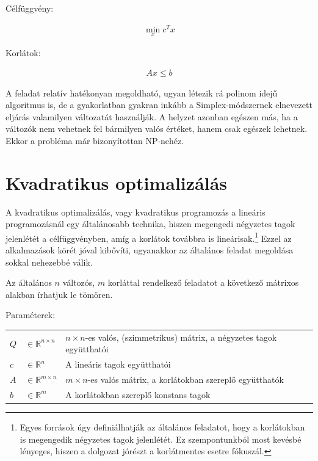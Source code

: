 Célfüggvény:

\begin{align}
	\min_{x} c^T x 
\end{align}

Korlátok:

\begin{align}
	Ax \leq b
\end{align}

A feladat relatív hatékonyan megoldható, ugyan létezik rá polinom idejű algoritmus is, de a gyakorlatban gyakran inkább a Simplex-módszernek elnevezett eljárás valamilyen változatát használják.
A helyzet azonban egészen más, ha a változók nem vehetnek fel bármilyen valós értéket, hanem csak egészek lehetnek. Ekkor a probléma már bizonyítottan NP-nehéz.


\section{Kvadratikus optimalizálás}\label{sec:QuadOpt}

A kvadratikus optimalizálás, vagy kvadratikus programozás a lineáris programozásnál egy általánosabb technika, hiszen megengedi négyzetes tagok jelenlétét a célfüggvényben, amíg a korlátok továbbra is lineárisak.\footnote{Egyes források úgy definiálhatják az általános feladatot, hogy a korlátokban is megengedik négyzetes tagok jelenlétét. Ez szempontunkból most kevésbé lényeges, hiszen a dolgozat jórészt a korlátmentes esetre fókuszál.} Ezzel az alkalmazások körét jóval kibővíti, ugyanakkor az általános feladat megoldása sokkal nehezebbé válik. 

Az általános $n$ változós, $m$ korláttal rendelkező feladatot a következő mátrixos alakban írhatjuk le tömören.

Paraméterek:

\begin{tabular}{lll}
	$Q$ & $\in \mathbb{R}^{n×n}$  & $n × n$-es valós, (szimmetrikus) mátrix, a négyzetes tagok együtthatói \\
	$c$ & $\in \mathbb{R}^n$   & A lineáris tagok együtthatói \\
	$A$ & $\in \mathbb{R}^{m×n}$  & $m × n$-es valós mátrix, a korlátokban szereplő együtthatók \\
	$b$ & $\in \mathbb{R}^m$   & A korlátokban szereplő konstans tagok \\
\end{tabular}

